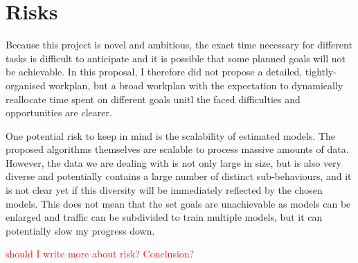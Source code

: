 \documentclass[a4paper,12pt,twoside]{report}
\begin{document}
\section{Risks}

Because this project is novel and ambitious, the exact time necessary for different tasks is difficult to anticipate and it is possible that some planned goals will not be achievable. In this proposal, I therefore did not propose a detailed, tightly-organised workplan, but a broad workplan with the expectation to dynamically reallocate time spent on different goals unitl the faced difficulties and opportunities are clearer.

One potential risk to keep in mind is the scalability of estimated models. The proposed algorithms themselves are scalable to process massive amounts of data. However, the data we are dealing with is not only large in size, but is also very diverse and potentially contains a large number of distinct sub-behaviours, and it is not clear yet if this diversity will be immediately reflected by the chosen models. This does not mean that the set goals are unachievable as models can be enlarged and traffic can be subdivided to train multiple models, but it can potentially slow my progress down.

\textcolor{red}{should I write more about risk? Conclusion?}





\end{document}
